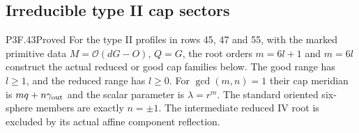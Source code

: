 \subsection{Irreducible type II cap sectors}

\begin{statement}{P3F.43}{Proved}
For the type II profiles in rows 45, 47 and 55, with the marked primitive data $M=\mathcal O(dG-O)$, $Q=G$, the root orders $m=6l+1$ and $m=6l$ construct the actual reduced or good cap families below. The good range has $l\ge1$, and the reduced range has $l\ge0$. For $\gcd(m,n)=1$ their cap meridian is $mq+n\gamma_{\rm out}$ and the scalar parameter is $\lambda=r^m$. The standard oriented six-sphere members are exactly $n=\pm1$. The intermediate reduced IV root is excluded by its actual affine component reflection.
\end{statement}
